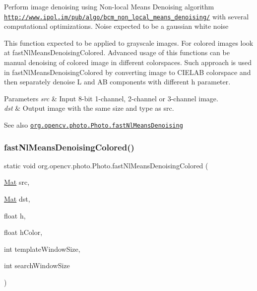 Perform image denoising using Non-\/local Means Denoising algorithm \href{http://www.ipol.im/pub/algo/bcm_non_local_means_denoising/}{\tt http\+://www.\+ipol.\+im/pub/algo/bcm\+\_\+non\+\_\+local\+\_\+means\+\_\+denoising/} with several computational optimizations. Noise expected to be a gaussian white noise

This function expected to be applied to grayscale images. For colored images look at {\ttfamily fast\+Nl\+Means\+Denoising\+Colored}. Advanced usage of this functions can be manual denoising of colored image in different colorspaces. Such approach is used in {\ttfamily fast\+Nl\+Means\+Denoising\+Colored} by converting image to C\+I\+E\+L\+AB colorspace and then separately denoise L and AB components with different h parameter.


\begin{DoxyParams}{Parameters}
{\em src} & Input 8-\/bit 1-\/channel, 2-\/channel or 3-\/channel image. \\
\hline
{\em dst} & Output image with the same size and type as {\ttfamily src}.\\
\hline
\end{DoxyParams}
\begin{DoxySeeAlso}{See also}
\href{http://docs.opencv.org/modules/photo/doc/denoising.html#fastnlmeansdenoising}{\tt org.\+opencv.\+photo.\+Photo.\+fast\+Nl\+Means\+Denoising} 
\end{DoxySeeAlso}
\mbox{\label{classorg_1_1opencv_1_1photo_1_1_photo_a445e4b8c401bc65ddd5d71d0d2e656f9}} 
\subsubsection{\texorpdfstring{fast\+Nl\+Means\+Denoising\+Colored()}{fastNlMeansDenoisingColored()}\hspace{0.1cm}{\footnotesize\ttfamily [1/2]}}
{\footnotesize\ttfamily static void org.\+opencv.\+photo.\+Photo.\+fast\+Nl\+Means\+Denoising\+Colored (\begin{DoxyParamCaption}\item[{\mbox{\hyperlink{classorg_1_1opencv_1_1core_1_1_mat}{Mat}}}]{src,  }\item[{\mbox{\hyperlink{classorg_1_1opencv_1_1core_1_1_mat}{Mat}}}]{dst,  }\item[{float}]{h,  }\item[{float}]{h\+Color,  }\item[{int}]{template\+Window\+Size,  }\item[{int}]{search\+Window\+Size }\end{DoxyParamCaption})\hspace{0.3cm}{\ttfamily [static]}}

